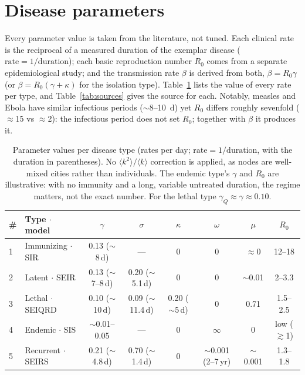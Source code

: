 \onecolumn
\raggedbottom  %
\appendix
\section{Disease parameters}
\label{app:sources}

Every parameter value is taken from the literature, not tuned. Each clinical rate is the
reciprocal of a measured duration of the exemplar disease ($\mathrm{rate}=1/\mathrm{duration}$);
each basic reproduction number $R_0$ comes from a separate epidemiological study; and the
transmission rate $\beta$ is derived from both, $\beta=R_0\gamma$ (or $\beta=R_0(\gamma+\kappa)$
for the isolation type). Table~\ref{tab:params-values} lists the value of every rate per type, and
Table~\ref{tab:sources} gives the source for each. Notably, measles and Ebola have similar
infectious periods ($\sim$8--10~d) yet $R_0$ differs roughly sevenfold ($\approx$15 vs
$\approx$2): the infectious period does not set $R_0$; together with $\beta$ it produces it.

\begin{table}[H]
\centering
\footnotesize
\caption{Parameter values per disease type (rates per day; $\mathrm{rate}=1/\mathrm{duration}$,
with the duration in parentheses). No $\langle k^2\rangle/\langle k\rangle$ correction is applied,
as nodes are well-mixed cities rather than individuals. The endemic type's $\gamma$ and $R_0$ are
illustrative: with no immunity and a long, variable untreated duration, the regime matters, not
the exact number. For the lethal type $\gamma_Q\approx\gamma\approx0.10$.}
\label{tab:params-values}
\begin{tabular}{@{}ll cccccc@{}}
\toprule
\# & Type $\cdot$ model & $\gamma$ & $\sigma$ & $\kappa$ & $\omega$ & $\mu$ & $R_0$ \\
\midrule
1 & Immunizing $\cdot$ SIR    & 0.13 ($\sim$8\,d)   & ---                 & 0                 & 0                          & $\approx$0  & 12--18 \\
2 & Latent $\cdot$ SEIR       & 0.13 ($\sim$7--8\,d) & 0.20 ($\sim$5.1\,d) & 0                 & 0                          & $\sim$0.01  & 2--3.3 \\
3 & Lethal $\cdot$ SEIQRD     & 0.10 ($\sim$10\,d)  & 0.09 ($\sim$11.4\,d) & 0.20 ($\sim$5\,d) & 0                          & 0.71        & 1.5--2.5 \\
4 & Endemic $\cdot$ SIS       & $\sim$0.01--0.05    & ---                 & 0                 & $\infty$                   & 0           & low ($\gtrsim$1) \\
5 & Recurrent $\cdot$ SEIRS   & 0.21 ($\sim$4.8\,d) & 0.70 ($\sim$1.4\,d) & 0                 & $\sim$0.001 (2--7\,yr)     & $\sim$0.001 & 1.3--1.8 \\
\bottomrule
\end{tabular}
\end{table}

